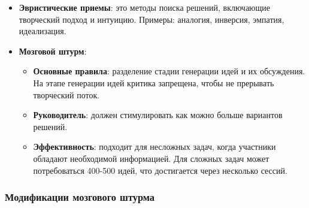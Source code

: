 \documentclass[
]{article}
\providecommand{\tightlist}{%
  \setlength{\itemsep}{0pt}\setlength{\parskip}{0pt}}
\begin{document}
\begin{itemize}
\item
  \textbf{Эвристические приемы}: это методы поиска решений, включающие
  творческий подход и интуицию. Примеры: аналогия, инверсия, эмпатия,
  идеализация.
\item
  \textbf{Мозговой штурм}:

  \begin{itemize}
  \tightlist
  \item
    \textbf{Основные правила}: разделение стадии генерации идей и их
    обсуждения. На этапе генерации идей критика запрещена, чтобы не
    прерывать творческий поток.
  \item
    \textbf{Руководитель}: должен стимулировать как можно больше
    вариантов решений.
  \item
    \textbf{Эффективность}: подходит для несложных задач, когда
    участники обладают необходимой информацией. Для сложных задач может
    потребоваться 400-500 идей, что достигается через несколько сессий.
  \end{itemize}
\end{itemize}

\subsubsection{\texorpdfstring{\textbf{Модификации мозгового
штурма}}{Модификации мозгового штурма}}\label{ux43cux43eux434ux438ux444ux438ux43aux430ux446ux438ux438-ux43cux43eux437ux433ux43eux432ux43eux433ux43e-ux448ux442ux443ux440ux43cux430}
\end{document}
